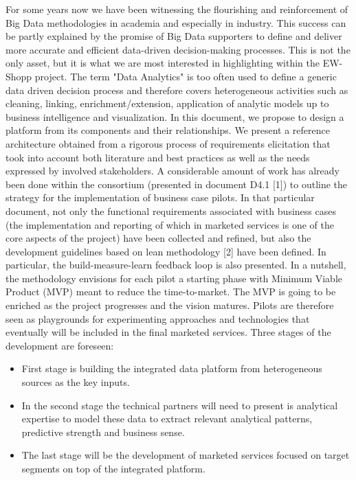 For some years now we have been witnessing the flourishing and reinforcement of Big Data methodologies in academia and especially in industry. 
This success can be partly explained by the promise of Big Data supporters to define and deliver more accurate and efficient data-driven decision-making processes.
This is not the only asset, but it is what we are most interested in highlighting within the EW-Shopp project. 
The term "Data Analytics" is too often used to define a generic data driven decision process and therefore covers heterogeneous activities such as cleaning, linking, enrichment/extension, application of analytic models up to business intelligence and visualization. 
In this document, we propose to design a platform from its components and their relationships. We present a reference architecture obtained from a rigorous process of requirements elicitation that took into account both literature and best practices as well as the needs expressed by involved stakeholders. 
A considerable amount of work has already been done within the consortium (presented in document D4.1 [1]) to outline the strategy for the implementation of business case pilots. In that particular document, not only the functional requirements associated with business cases (the implementation and reporting of which in marketed services is one of the core aspects of the project) have been collected and refined, but also the development guidelines based on lean methodology [2] have been defined. In particular, the build-measure-learn feedback loop is also presented. In a nutshell, the methodology envisions for each pilot a starting phase with Minimum Viable Product (MVP) meant to reduce the time-to-market. The MVP is going to be enriched as the project progresses and the vision matures. Pilots are therefore seen as playgrounds for experimenting approaches and technologies that eventually will be included in the final marketed services. 
Three stages of the development are foreseen:
\begin{itemize}
    \item First stage is building the integrated data platform from heterogeneous sources as the key inputs. 
    \item In the second stage the technical partners will need to present is analytical expertise to model these data to extract relevant analytical patterns, predictive strength and business sense.
    \item The last stage will be the development of marketed services focused on target segments on top of the integrated platform.
\end{itemize}

